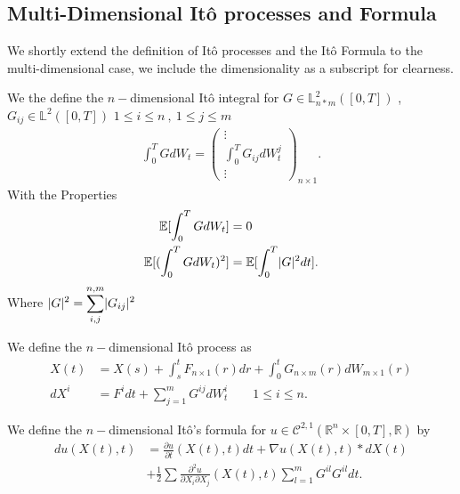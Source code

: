 \subsection{Multi-Dimensional It\^o processes and Formula}
We shortly extend the definition of It\^o processes and the It\^o Formula to the multi-dimensional case, we
include the dimensionality as a subscript for clearness.
\begin{definition}
  We the define the $n-$dimensional It\^o integral for $G \in  \mathbb{L}^{2}_{n*m}([0,T]) $ , $G_{ij} \in  \mathbb{L}^{2}([0,T])$ $1\le i\le n \ , \ 1 \le j \le m$
  \begin{align*}
    \int_0^{T} G d W_t = \begin{pmatrix} \vdots \\ \int_0^{T} G_{ij} d W^{j}_t \\ \vdots    \end{pmatrix}_{n \times 1}
  .\end{align*}
  With the Properties 
  \begin{align*}
    \mathbb{E}[\int_0^{T} G dW_t ] &= 0  \\
    \mathbb{E}[(\int_0^{T} G dW_t )^2] &= \mathbb{E}[\int_0^{T} \lvert G\rvert^2 dt ]
  .\end{align*}
  Where $\displaystyle\lvert G\rvert^2 = \sum_{i,j}^{n,m} \lvert G_{ij}\rvert^2 $ 
\end{definition}
\begin{definition}
 We define the $n-$dimensional It\^o process as  
 \begin{align*}
   X(t) &= X(s) + \int_s^{t} F_{n \times  1}(r) dr   + \int_0^{t} G_{n \times  m}(r) dW_{m \times  1}(r)  \\
   dX^{i} &= F^{i} dt + \sum_{j=1}^{m} G^{ij} dW_t^i      \qquad 1\le i \le n
 .\end{align*}
\end{definition}
\begin{theorem}
  We define the $n-$dimensional It\^o's formula for $u \in  \mathcal{C}^{2,1}(\mathbb{R}^{n} \times [0,T],\mathbb{R} ) $ by 
  \begin{align*}
    du(X(t),t) &= \frac{\partial u}{\partial t}(X(t),t) dt + \nabla u(X(t),t) * dX(t) \\
               &+ \frac{1}{2} \sum \frac{\partial ^2 u}{\partial X_i \partial X_j}(X(t),t) \sum_{l=1}^{m}  G^{il} G^{il}dt 
  .\end{align*}
\end{theorem}
